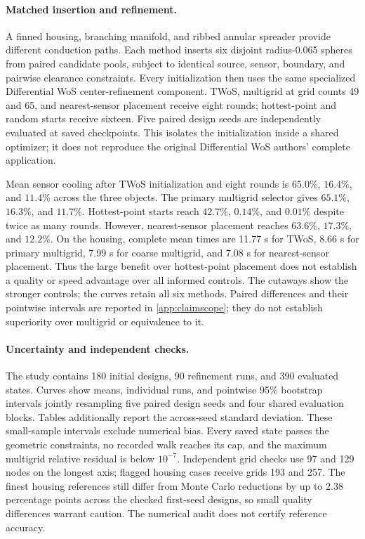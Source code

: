 

\paragraph{Matched insertion and refinement.}
A finned housing, branching manifold, and ribbed annular spreader provide
different conduction paths. Each method inserts six disjoint radius-0.065
spheres from paired candidate pools, subject to identical source, sensor,
boundary, and pairwise clearance constraints. Every initialization then uses
the same specialized Differential WoS center-refinement component. TWoS,
multigrid at grid counts 49 and 65, and nearest-sensor placement receive eight
rounds; hottest-point and random starts receive sixteen. Five paired design
seeds are independently evaluated at saved checkpoints. This isolates the
initialization inside a shared optimizer; it does not reproduce the original
Differential WoS authors' complete application.

Mean sensor cooling after TWoS initialization and eight rounds is
$65.0\%$, $16.4\%$, and $11.4\%$ across the three objects. The primary
multigrid selector gives $65.1\%$, $16.3\%$, and $11.7\%$. Hottest-point
starts reach $42.7\%$, $0.14\%$, and $0.01\%$ despite twice as many rounds.
However, nearest-sensor placement reaches $63.6\%$, $17.3\%$, and $12.2\%$.
On the housing, complete mean times are 11.77 s for TWoS, 8.66 s for primary
multigrid, 7.99 s for coarse multigrid, and 7.08 s for nearest-sensor placement.
Thus the large benefit over hottest-point placement does not establish a
quality or speed advantage over all informed controls. The cutaways show
the stronger controls; the curves retain all six methods. Paired differences
and their pointwise intervals are reported in \cref{app:claimscope}; they do
not establish superiority over multigrid or equivalence to it.



\paragraph{Uncertainty and independent checks.}
The study contains 180 initial designs, 90 refinement runs, and 390 evaluated
states. Curves show means, individual runs, and pointwise 95\% bootstrap
intervals jointly resampling five paired design seeds and four shared
evaluation blocks. Tables additionally report the across-seed standard
deviation. These small-sample intervals exclude numerical bias. Every saved
state passes the geometric constraints, no recorded walk reaches its cap,
and the maximum multigrid relative residual is below $10^{-7}$.
Independent grid checks use 97 and 129 nodes on the longest axis; flagged
housing cases receive grids 193 and 257. The finest housing references still
differ from Monte Carlo reductions by up to 2.38 percentage points across
the checked first-seed designs, so small quality differences warrant caution.
The numerical audit does not certify reference accuracy.

